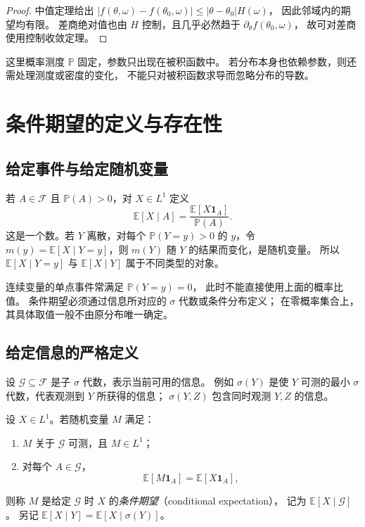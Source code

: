 \documentclass[UTF8,12pt,a4paper,fontset=fandol]{ctexart}
\begin{document}
\begin{proof}
中值定理给出
$|f(\theta,\omega)-f(\theta_0,\omega)|\leq|\theta-\theta_0|H(\omega)$，
因此邻域内的期望均有限。
差商绝对值也由 $H$ 控制，且几乎必然趋于 $\partial_\theta f(\theta_0,\omega)$，
故可对差商使用控制收敛定理。
\end{proof}

这里概率测度 $\mathbb P$ 固定，参数只出现在被积函数中。
若分布本身也依赖参数，则还需处理测度或密度的变化，
不能只对被积函数求导而忽略分布的导数。

\section{条件期望的定义与存在性}
\label{sec:conditional-definition}

\subsection{给定事件与给定随机变量}

若 $A\in\mathcal F$ 且 $\mathbb P(A)>0$，对 $X\in L^1$ 定义
\[
  \mathbb E[X\mid A]
  =\frac{\mathbb E[X\mathbf1_A]}{\mathbb P(A)}.
\]
这是一个数。若 $Y$ 离散，对每个 $\mathbb P(Y=y)>0$ 的 $y$，令
$m(y)=\mathbb E[X\mid Y=y]$，则 $m(Y)$ 随 $Y$ 的结果而变化，是随机变量。
所以 $\mathbb E[X\mid Y=y]$ 与 $\mathbb E[X\mid Y]$ 属于不同类型的对象。

连续变量的单点事件常满足 $\mathbb P(Y=y)=0$，
此时不能直接使用上面的概率比值。
条件期望必须通过信息所对应的 $\sigma$ 代数或条件分布定义；
在零概率集合上，其具体取值一般不由原分布唯一确定。

\subsection{给定信息的严格定义}

设 $\mathcal G\subseteq\mathcal F$ 是子 $\sigma$ 代数，表示当前可用的信息。
例如 $\sigma(Y)$ 是使 $Y$ 可测的最小 $\sigma$ 代数，代表观测到 $Y$ 所获得的信息；
$\sigma(Y,Z)$ 包含同时观测 $Y,Z$ 的信息。

\begin{definition}[条件期望]
\label{def:conditional-expectation}
设 $X\in L^1$。若随机变量 $M$ 满足：
\begin{enumerate}
  \item $M$ 关于 $\mathcal G$ 可测，且 $M\in L^1$；
  \item 对每个 $A\in\mathcal G$，
  \begin{equation}
    \mathbb E[M\mathbf1_A]=\mathbb E[X\mathbf1_A],
    \label{eq:conditional-defining-identity}
  \end{equation}
\end{enumerate}
则称 $M$ 是给定 $\mathcal G$ 时 $X$ 的\emph{条件期望}（conditional expectation），
记为 $\mathbb E[X\mid\mathcal G]$。
另记 $\mathbb E[X\mid Y]=\mathbb E[X\mid\sigma(Y)]$。
\end{definition}
\end{document}

